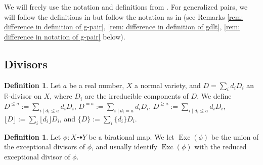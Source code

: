 \documentclass[11pt]{amsart}
\numberwithin{equation}{section}
\newcommand{\Rr}{\mathbb{R}}
\newcommand{\Exc}{\operatorname{Exc}}
\theoremstyle{definition}
\newtheorem{defn}[thm]{Definition}
\theoremstyle{definition}
\theoremstyle{definition}
\begin{document}
We will freely use the notation and definitions from \cite{KM98,BCHM10}. For generalized pairs, we will follow the definitions in \cite{HL18} but follow the notation as in \cite{FS20b,Has20} (see Remarks \ref{rem: difference in definition of g-pair}, \ref{rem: difference in definition of gdlt}, \ref{rem: difference in notation of g-pair} below).



\subsection{Divisors}
\begin{defn}
Let $a$ be a real number, $X$ a normal variety, and $D=\sum_i d_iD_i$ an $\Rr$-divisor on $X$, where $D_i$ are the irreducible components of $D$. We define $D^{\leq a}:=\sum_{i\mid d_i\leq a} d_iD_i$, $D^{=a}:=\sum_{i\mid d_i=a} d_iD_i$,  $D^{\geq a}:=\sum_{i\mid d_i\leq a} d_iD_i$, $\lfloor D\rfloor:=\sum_i\lfloor d_i\rfloor D_i$, and $\{D\}:=\sum_i\{d_i\}D_i$.
\end{defn}


\begin{defn}
Let $\phi: X\dashrightarrow Y$ be a birational map. We let $\Exc(\phi)$ be the union of the exceptional divisors of $\phi$, and usually identify $\Exc(\phi)$ with the reduced exceptional divisor of $\phi$.
\end{defn}
\end{document}
